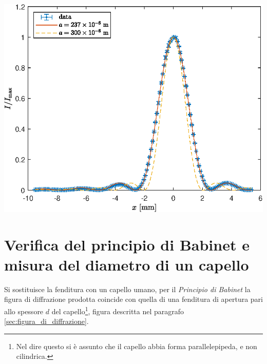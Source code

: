 \documentclass[10pt,oneside,a4paper]{article}
\newenvironment{Figure}
  {\par\medskip\noindent\minipage{\linewidth}}
  {\endminipage\par\medskip}
\begin{document}
\begin{multicols}{2}
\begin{Figure}
	\begin{center}
	\includegraphics[width=1.1\linewidth]{figura_diffrazione.eps}
	\label{fig:I}
	\end{center}
\end{Figure}


\section{Verifica del principio di Babinet e misura del diametro di un capello}
Si sostituisce la fenditura con un capello umano, per il \emph{Principio di Babinet} la figura di diffrazione prodotta coincide con quella di una fenditura di apertura pari allo spessore $d$ del capello\footnote{Nel dire questo si è assunto che il capello abbia forma parallelepipeda, e non cilindrica.}, figura descritta nel paragrafo \ref{sec:figura_di_diffrazione}. 


\end{multicols}
\end{document}
